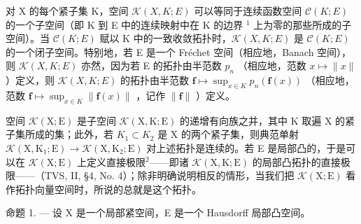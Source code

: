 对 X 的每个紧子集 K，空间 \(\mathcal{K}(X,K;E)\) 可以等同于连续函数空间 \(\mathcal{C}(K;E)\) 的一个子空间（即 K 到 E 中的连续映射中在 K 的边界 \(^{1}\) 上为零的那些所成的子空间）。当 \(\mathcal{C}(K;E)\) 赋以 K 中的一致收敛拓扑时，\(\mathcal{K}(X,K;E)\) 是 \(\mathcal{C}(K;E)\) 的一个闭子空间。特别地，若 E 是一个 Fréchet 空间（相应地，Banach 空间），则 \(\mathcal{K}(X,K;E)\) 亦然，因为若 E 的拓扑由半范数 \(p_{n}\) （相应地，范数 \(x \mapsto \|x\|\) ）定义，则 \(\mathcal{K}(X,K;E)\) 的拓扑由半范数 \(\mathbf{f} \mapsto \sup_{x \in K} p_n(\mathbf{f}(x))\) （相应地，范数 \(\mathbf{f} \mapsto \sup_{x \in K} \| \mathbf{f}(x) \|\) ，记作 \(\| \mathbf{f} \|\) ）定义。

空间 \(\mathcal{K}(\mathrm{X};\mathrm{E})\) 是子空间 \(\mathcal{K}(\mathrm{X},\mathrm{K};\mathrm{E})\) 的递增有向族之并，其中 K 取遍 X 的紧子集所成的集；此外，若 \(K_{1}\subset K_{2}\) 是 X 的两个紧子集，则典范单射 \(\mathcal{K}(\mathrm{X},\mathrm{K}_{1};\mathrm{E})\to\mathcal{K}(\mathrm{X},\mathrm{K}_{2};\mathrm{E})\) 对上述拓扑是连续的。若 E 是局部凸的，于是可以在 \(\mathcal{K}(\mathrm{X};\mathrm{E})\) 上定义直接极限\(^{2}\)——即诸 \(\mathcal{K}(\mathrm{X},\mathrm{K};\mathrm{E})\) 的局部凸拓扑的直接极限——（TVS, II, §4, No. 4）；除非明确说明相反的情形，当我们把 \(\mathcal{K}(\mathrm{X};\mathrm{E})\) 看作拓扑向量空间时，所说的总就是这个拓扑。

命题 1. --- 设 X 是一个局部紧空间，E 是一个 Hausdorff 局部凸空间。


